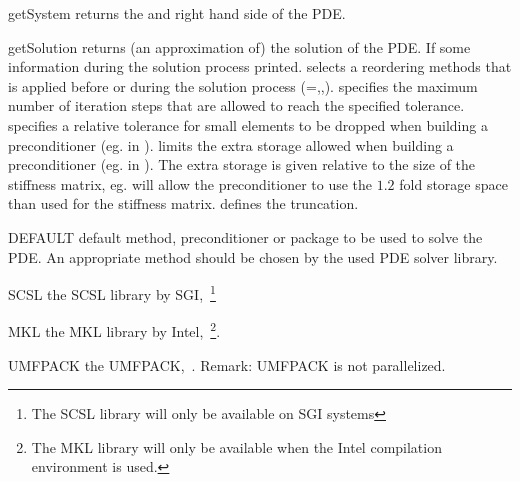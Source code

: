 \begin{methoddesc}[LinearPDE]{getSystem}{}
returns the \Operator and right hand side of the PDE.
\end{methoddesc}

\begin{methoddesc}[LinearPDE]{getSolution}{
}
returns (an approximation of) the solution of the PDE. If  some information during the solution process printed.
 selects a reordering methods that is applied before or during the solution process
(=\NOREORDERING ,\MINIMUMFILLIN ,\NESTEDDESCTION).
 specifies the maximum number of iteration steps that are allowed to reach the specified tolerance.
 specifies a relative tolerance for small elements to be dropped when building a preconditioner
(eg. in \ILUT).  limits the extra storage allowed when building a preconditioner
(eg. in \ILUT). The extra storage is given relative to the size of the stiffness matrix, eg.
 will allow the preconditioner to use the $1.2$ fold storage space than used
for the stiffness matrix.  defines the truncation.
\end{methoddesc}

\begin{memberdesc}[LinearPDE]{DEFAULT}
default method, preconditioner or package to be used to solve the PDE. An appropriate method should be
chosen by the used PDE solver library.
\end{memberdesc}

\begin{memberdesc}[LinearPDE]{SCSL}
the SCSL library by SGI,~\footnote{The SCSL library will only be available on SGI systems}
\end{memberdesc}

\begin{memberdesc}[LinearPDE]{MKL}
the MKL library by Intel,~\footnote{The MKL library will only be available when the Intel compilation environment is used.}.
\end{memberdesc}

\begin{memberdesc}[LinearPDE]{UMFPACK}
the UMFPACK,~. Remark: UMFPACK is not parallelized.
\end{memberdesc}

